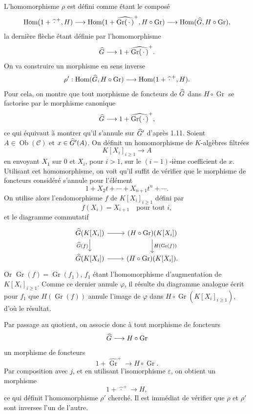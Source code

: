 \documentclass[11pt]{article}
\begin{document}
L'homomorphisme \(\rho\) est défini comme étant le composé
\[
  \operatorname{Hom}(1+\widehat{\,\cdot\,}^{+},H)
  \longrightarrow
  \operatorname{Hom}(1+\widehat{\operatorname{Gr}(\,\cdot\,)}^{+},H\circ\operatorname{Gr})
  \longrightarrow
  \operatorname{Hom}(\widehat G,H\circ\operatorname{Gr}),
\]
la dernière flèche étant définie par l'homomorphisme
\[
  \widehat G\longrightarrow1+\widehat{\operatorname{Gr}(\,\cdot\,)}^{+}.
\]
On va construire un morphisme en sens inverse
\[
  \rho':\operatorname{Hom}(\widehat G,H\circ\operatorname{Gr})
  \longrightarrow
  \operatorname{Hom}(1+\widehat{\,\cdot\,}^{+},H).
\]
Pour cela, on montre que tout morphisme de foncteurs de \(\widehat G\) dans \(H\circ\operatorname{Gr}\) se factorise par le morphisme canonique
\[
  \widehat G\longrightarrow1+\widehat{\operatorname{Gr}(\,\cdot\,)}^{+},
\]
ce qui équivaut à montrer qu'il s'annule sur \(\widehat G'\) d'après 1.11. Soient \(A\in\operatorname{Ob}(\mathcal C)\) et \(x\in\widehat G'(A)\). On définit un homomorphisme de \(K\)-algèbres filtrées
\[
  K[X_i]_{i\geq1}\longrightarrow A
\]
en envoyant \(X_1\) sur \(0\) et \(X_i\), pour \(i>1\), sur le \((i-1)\)-ième coefficient de \(x\). Utilisant cet homomorphisme, on voit qu'il suffit de vérifier que le morphisme de foncteurs considéré s'annule pour l'élément
\[
  1+X_2t+\cdots+X_{n+1}t^n+\cdots.
\]
On utilise alors l'endomorphisme \(f\) de \(K[X_i]_{i\geq1}\) défini par
\[
  f(X_i)=X_{i+1}\quad\text{pour tout }i,
\]
et le diagramme commutatif
\[
\begin{tikzcd}
\Ghat(K[X_i]) \arrow[r] \arrow[d,"\Ghat(f)"'] &
(H\circ\operatorname{Gr})(K[X_i]) \arrow[d,"H(\operatorname{Gr}(f))"]\\
\Ghat(K[X_i]) \arrow[r] &
(H\circ\operatorname{Gr})(K[X_i]).
\end{tikzcd}
\]
Or \(\operatorname{Gr}(f)=\operatorname{Gr}(f_1)\), \(f_1\) étant l'homomorphisme d'augmentation de \(K[X_i]_{i\geq1}\). Comme ce dernier annule \(\varphi\), il résulte du diagramme analogue écrit pour \(f_1\) que \(H(\operatorname{Gr}(f))\) annule l'image de \(\varphi\) dans \(H\circ\operatorname{Gr}(K[X_i]_{i\geq1})\), d'où le résultat.

Par passage au quotient, on associe donc à tout morphisme de foncteurs
\[
  \widehat G\longrightarrow H\circ\operatorname{Gr}
\]
un morphisme de foncteurs
\[
  1+\widehat{\operatorname{Gr}}^{+}\longrightarrow H\circ\operatorname{Gr}.
\]
Par composition avec \(j\), et en utilisant l'isomorphisme \(\varepsilon\), on obtient un morphisme
\[
  1+\widehat{\,\cdot\,}^{+}\longrightarrow H,
\]
ce qui définit l'homomorphisme \(\rho'\) cherché. Il est immédiat de vérifier que \(\rho\) et \(\rho'\) sont inverses l'un de l'autre.
\end{document}
